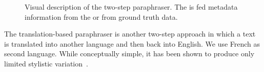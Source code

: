 \begin{figure}[ht]
{
}
  \caption[Two-step paraphraser]{Visual description of the two-step paraphraser.
  The \pgenerator{} is fed metadata information from the \pextractor{} or from ground truth data.}
  \label{fig:two_step_paraphraser}
\end{figure}


The translation-based paraphraser is another two-step approach in which a text is translated into another language and then back into English. 
We use French as second language.
While conceptually simple, it has been shown to produce only limited stylistic variation~\citep{zhou_paraphrase_2025}.